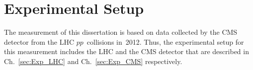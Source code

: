 \chapter{Experimental Setup} %
\label{sec:Exp}

The measurement of this dissertation is based on data collected by the CMS detector from the LHC $pp$~collisions in~2012. Thus, the experimental setup for this measurement includes the LHC and the CMS detector that are described in Ch.~\ref{sec:Exp_LHC} and Ch.~\ref{sec:Exp_CMS} respectively. 

